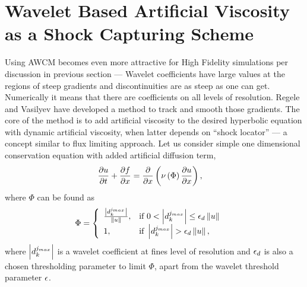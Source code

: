 \section{Wavelet Based Artificial Viscosity as a Shock Capturing Scheme}
Using AWCM becomes even more attractive for High Fidelity simulations per discussion in previous section --- Wavelet coefficients have large values at the regions of steep gradients and discontinuities are as steep as one can get. Numerically it means that there are coefficients on all levels of resolution. Regele and Vasilyev \cite{lib:RegVas} have developed a method to track and smooth those gradients. The core of the method is to add artificial viscosity to the desired hyperbolic equation with dynamic artificial viscosity, when latter depends on ``shock locator'' --- a concept similar to flux limiting approach. Let us consider simple one dimensional conservation equation with added artificial diffusion term,
\begin{align}
\frac {\partial u}{\partial t} + \frac {\partial f}{\partial x} &= \frac {\partial} {\partial x} \left(\nu \left(\Phi\right) \frac {\partial u}{\partial x}\right),
\end{align}
where $\Phi$ can be found as
\begin{align}
\Phi &= \left\{\begin{array}{ll}
\frac {\left|d_k^{j_{max}}\right|}{\left\|u\right\|}, & \textmd{if } 0 < \left|d_k^{j_{max}}\right| \le \epsilon_d \left\|u\right\| \\
1, & \textmd{if } \left|d_k^{j_{max}}\right| > \epsilon_d \left\|u\right\|,
\end{array}\right.
\end{align}
where $\left|d_k^{j_{max}}\right|$ is a wavelet coefficient at fines level of resolution and $\epsilon_d$ is also a chosen thresholding parameter to limit $\Phi$, apart from the wavelet threshold parameter $\epsilon$.

